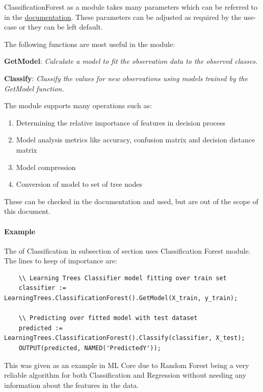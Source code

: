 \documentclass[a4paper,oneside,12pt]{book}
\begin{document}
ClassificationForest as a module takes many parameters which can be referred to in the \href{https://cdn.hpccsystems.com/pdf/ml/LearningTrees.pdf}{documentation}. These parameters can be adjusted as required by the use-case or they can be left default. 

The following functions are most useful in the module:

\textbf{GetModel}: \textit{Calculate a model to fit the observation data to the observed classes.}

\textbf{Classify}: \textit{Classify the values for new observations using models trained by the GetModel function.}

The module supports many operations such as: 

\begin{enumerate}
    \item Determining the relative importance of features in decision process
    \item Model analysis metrics like accuracy, confusion matrix and decision distance matrix
    \item Model compression
    \item Conversion of model to set of tree nodes
\end{enumerate}

These can be checked in the documentation and used, but are out of the scope of this document.

\paragraph{Example}

The  of Classification in  subsection of section  uses Classification Forest module. The lines to keep of importance are:

\begin{lstlisting}
    \\ Learning Trees Classifier model fitting over train set
    classifier := LearningTrees.ClassificationForest().GetModel(X_train, y_train);
    
    \\ Predicting over fitted model with test dataset
    predicted := LearningTrees.ClassificationForest().Classify(classifier, X_test);
    OUTPUT(predicted, NAMED('PredictedY'));
\end{lstlisting}

This was given as an example in ML Core due to Random Forest being a very reliable algorithm for both Classification and Regression without needing any information about the features in the data.
\end{document}
